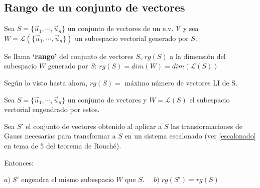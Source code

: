 \subsection{Rango de un conjunto de vectores}

\begin{definition}

Sea $S=\{ \vec u_1, \cdots , \vec u_n \}$ un conjunto de vectores de un e.v. $\mathcal V$ y sea $W=\mathcal L(\{ \vec u_1, \cdots , \vec u_n \})$ un subespacio vectorial generado por $S$.

Se llama \textbf{`rango'} del conjunto de vectores $S$, $rg(S)$ a la dimensión del subespacio $W$ generado por $S$: $rg(S)=dim(W)=dim(\mathcal L(S))$
\end{definition}

Según lo visto hasta ahora, $rg(S)=$ máximo número de vectores LI de S.

\begin{theorem}

Sea  $S=\{ \vec u_1, \cdots , \vec u_n \}$ un conjunto de vectores y $W=\mathcal L(S)$ el subespacio vectorial engendrado por estos.

Sea $S'$ el conjunto de vectores obtenido al aplicar a $S$ las transformaciones de Gauss necesarias para transformar a $S$ en un sistema escalonado (ver \ref{escalonado} en tema de  5 del teorema de Rouché).

Entonces:


$a)\; S'$ engendra el mismo subespacio $W$ que $S$.
$\quad b)\; rg(S')=rg(S)$	


\end{theorem}


